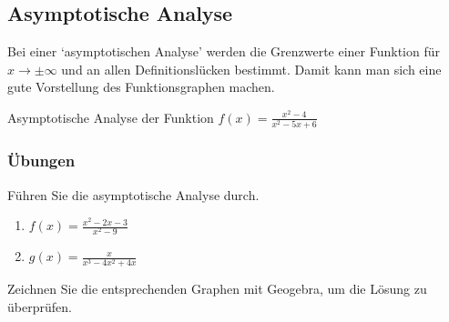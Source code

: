 \subsection{Asymptotische Analyse}
Bei einer `asymptotischen Analyse' werden die Grenzwerte einer Funktion für $x\to\pm\infty$ und an allen Definitionslücken bestimmt. Damit kann man sich eine gute Vorstellung des Funktionsgraphen machen.

\begin{example}
    {Asymptotische Analyse der Funktion $f(x)= \frac{x^2-4}{x^2-5x+6}$}{}
\end{example}

\subsubsection{Übungen}
Führen Sie die asymptotische Analyse durch.
\begin{enumerate}
    \item $f(x) = \frac{x^2-2x-3}{x^2-9}$
    \item $g(x) = \frac{x}{x^3-4x^2+4x}$
\end{enumerate}

Zeichnen Sie die entsprechenden Graphen mit Geogebra, um die Lösung zu überprüfen.
\clearpage